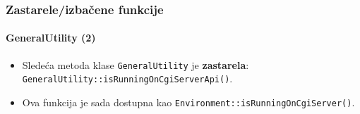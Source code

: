 
\begin{frame}[fragile]
	\frametitle{Zastarele/izbačene funkcije}
	\framesubtitle{GeneralUtility (2)}

	\begin{itemize}
		\item Sledeća metoda klase \texttt{GeneralUtility} je \textbf{zastarela}:
			\texttt{GeneralUtility::isRunningOnCgiServerApi()}.
		\item Ova funkcija je sada dostupna kao\newline
			\texttt{Environment::isRunningOnCgiServer()}.

	\end{itemize}

\end{frame}


